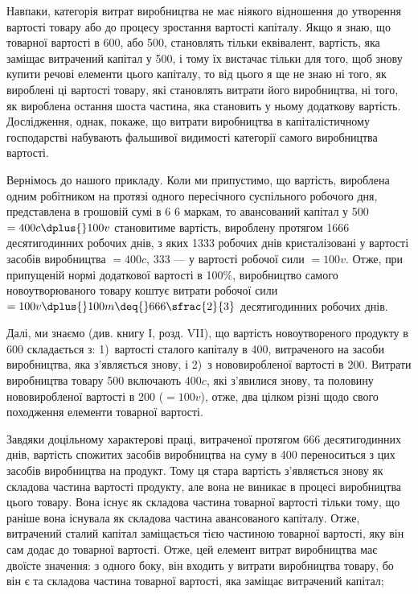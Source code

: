 
Навпаки, категорія витрат виробництва не має ніякого відношення
до утворення вартості товару або до процесу зростання
вартості капіталу. Якщо я знаю, що  товарної вартості
в 600, або 500, становлять
тільки еквівалент, вартість, яка заміщає витрачений капітал
у 500, і тому їх вистачає тільки для того, щоб
знову купити речові елементи цього капіталу, то від цього
я ще не знаю ні того, як вироблені ці   вартості товару, які
становлять витрати його виробництва, ні того, як вироблена
остання шоста частина, яка становить у ньому додаткову вартість.
Дослідження, однак, покаже, що витрати виробництва в капіталістичному
господарстві набувають фальшивої видимості категорії
самого виробництва вартості.

Вернімось до нашого прикладу. Коли ми припустимо, що вартість,
вироблена одним робітником на протязі одного пересічного
суспільного робочого дня, представлена в грошовій сумі
в 6 \deq{} 6 маркам, то авансований капітал у 500 $= 400 c \dplus{} 100 v$ становитиме вартість, вироблену протягом
1666 десятигодинних робочих днів, з яких 1333 робочих
днів кристалізовані у вартості засобів виробництва $= 400 c$,
333  — у вартості робочої сили $= 100v$. Отже, при припущеній
нормі додаткової вартості в 100\%, виробництво самого новоутворюваного
товару коштує витрати робочої сили $= 100v \dplus{} 100m \deq{} 666\sfrac{2}{3}$ десятигодинних робочих днів.

Далі, ми знаємо (див. книгу І, розд. VII), що вартість
новоутвореного продукту в 600 складається
з: 1)~вартості сталого капіталу в 400,
витраченого на засоби виробництва, яка з’являється знову, і
2)~з нововиробленої вартості в 200. Витрати
виробництва товару \deq{} 500 включають $400 c$,
які з’явилися знову, та половину нововиробленої вартості в
200 ($= 100 v$), отже, два цілком різні щодо
свого походження елементи товарної вартості.

Завдяки доцільному характерові праці, витраченої протягом
666  десятигодинних днів, вартість спожитих засобів виробництва
на суму в 400 переноситься з цих
засобів виробництва на продукт. Тому ця стара вартість з’являється
знову як складова частина вартості продукту, але вона
не виникає в процесі виробництва цього товару. Вона існує як
складова частина товарної вартості тільки тому, що раніше вона
існувала як складова частина авансованого капіталу. Отже, витрачений
сталий капітал заміщається тією частиною товарної
вартості, яку він сам додає до товарної вартості. Отже, цей
елемент витрат виробництва має двоїсте значення: з одного боку,
він входить у витрати виробництва товару, бо він є та складова
частина товарної вартості, яка заміщає витрачений капітал;
\parbreak{}  %

